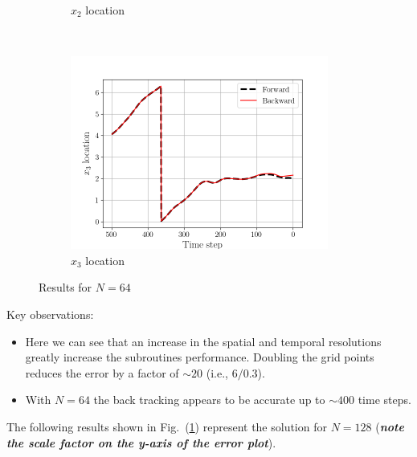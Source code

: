 \begin{figure}[H]
\begin{subfigure}[H]{0.45\textwidth}
        \caption{$x_{2}$ location}
    \end{subfigure}
    ~
    \begin{subfigure}[H]{0.45\textwidth}
        \includegraphics[height=2.5in]{media/rk4/run-64/x3-64-tracking.png}
        \caption{$x_{3}$ location}
    \end{subfigure}
    \caption{Results for $N=64$}
    \label{fig:back-tracking-64}
\end{figure}
Key observations:
\begin{itemize}
    \item Here we can see that an increase in the spatial and temporal
        resolutions greatly increase the subroutines performance. Doubling
        the grid points reduces the error by a factor of $\sim20$ (i.e., $6/0.3$).
    \item With $N=64$ the back tracking appears to be accurate up to $\sim
        400$ time steps.
\end{itemize}

The following results shown in Fig.~(\ref{fig:back-tracking-64}) represent
the solution for $N=128$ (\emph{\textbf{note the scale factor on the
y-axis of the error plot}}).

